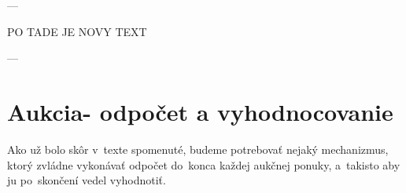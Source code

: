 









\iffalse

---

PO TADE JE NOVY TEXT

---

\section{Aukcia- odpočet a vyhodnocovanie}

Ako už bolo skôr v~texte spomenuté, budeme potrebovať nejaký mechanizmus, ktorý zvládne vykonávať odpočet do~konca každej aukčnej ponuky, a~takisto aby ju po~skončení vedel vyhodnotiť.


